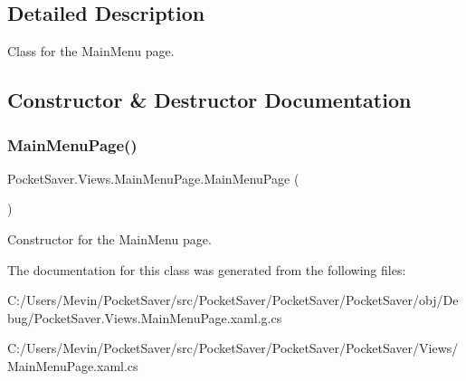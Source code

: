 \subsection{Detailed Description}
Class for the Main\+Menu page. 



\subsection{Constructor \& Destructor Documentation}
\mbox{\label{class_pocket_saver_1_1_views_1_1_main_menu_page_aee8c6fc4d2a5fb1f7ee53f9175d2c84d}} 
\subsubsection{\texorpdfstring{Main\+Menu\+Page()}{MainMenuPage()}}
{\footnotesize\ttfamily Pocket\+Saver.\+Views.\+Main\+Menu\+Page.\+Main\+Menu\+Page (\begin{DoxyParamCaption}{ }\end{DoxyParamCaption})\hspace{0.3cm}{\ttfamily [inline]}}



Constructor for the Main\+Menu page. 



The documentation for this class was generated from the following files\+:\begin{DoxyCompactItemize}
\item 
C\+:/\+Users/\+Mevin/\+Pocket\+Saver/src/\+Pocket\+Saver/\+Pocket\+Saver/\+Pocket\+Saver/obj/\+Debug/Pocket\+Saver.\+Views.\+Main\+Menu\+Page.\+xaml.\+g.\+cs\item 
C\+:/\+Users/\+Mevin/\+Pocket\+Saver/src/\+Pocket\+Saver/\+Pocket\+Saver/\+Pocket\+Saver/\+Views/Main\+Menu\+Page.\+xaml.\+cs\end{DoxyCompactItemize}
